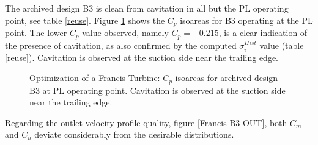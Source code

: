 \FloatBarrier
The archived design B3 is clean from cavitation in all but the PL operating point, see table \ref{reuse}. Figure \ref{Francis-B3-PL} shows the $C_p$ isoareas for  B3 operating at the PL point. The lower $C_p$ value observed, namely $C_p= -0.215$, is a clear indication of the presence of cavitation, as also confirmed by the computed $\sigma_i^{Hist}$ value (table \ref{reuse}). Cavitation is observed at the suction side near the trailing edge.     


\begin{figure}[h!]
\begin{minipage}[b]{1\linewidth}
 \centering
\end{minipage}
\caption{Optimization of a Francis Turbine: $C_p$ isoareas for archived design B3 at PL operating point. Cavitation is observed at the suction side near the trailing edge.}
\label{Francis-B3-PL}
\end{figure}

Regarding the outlet velocity profile quality, figure \ref{Francis-B3-OUT}, both $C_m$  and $C_u$ deviate considerably from the desirable distributions.   

